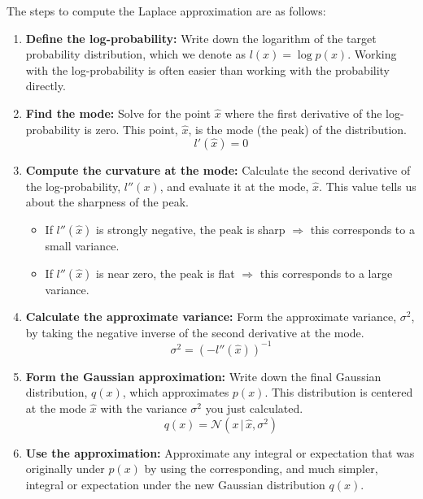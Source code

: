\documentclass{article}
\begin{document}
\begin{multicols}{2}
	The steps to compute the Laplace approximation are as follows:

	\begin{enumerate}
		\item \textbf{Define the log-probability:}
		      Write down the logarithm of the target probability distribution, which we denote as $l(x) = \log p(x)$. Working with the log-probability is often easier than working with the probability directly.

		\item \textbf{Find the mode:}
		      Solve for the point $\hat{x}$ where the first derivative of the log-probability is zero. This point, $\hat{x}$, is the mode (the peak) of the distribution.
		      $$ l'(\hat{x}) = 0 $$

		\item \textbf{Compute the curvature at the mode:}
		      Calculate the second derivative of the log-probability, $l''(x)$, and evaluate it at the mode, $\hat{x}$. This value tells us about the sharpness of the peak.
		      \begin{itemize}
			      \item If $l''(\hat{x})$ is strongly negative, the peak is sharp $\Rightarrow$ this corresponds to a small variance.
			      \item If $l''(\hat{x})$ is near zero, the peak is flat $\Rightarrow$ this corresponds to a large variance.
		      \end{itemize}

		\item \textbf{Calculate the approximate variance:}
		      Form the approximate variance, $\sigma^2$, by taking the negative inverse of the second derivative at the mode.
		      $$ \sigma^2 = (-l''(\hat{x}))^{-1} $$

		\item \textbf{Form the Gaussian approximation:}
		      Write down the final Gaussian distribution, $q(x)$, which approximates $p(x)$. This distribution is centered at the mode $\hat{x}$ with the variance $\sigma^2$ you just calculated.
		      $$ q(x) = \mathcal{N}(x \,|\, \hat{x}, \sigma^2) $$

		\item \textbf{Use the approximation:}
		      Approximate any integral or expectation that was originally under $p(x)$ by using the corresponding, and much simpler, integral or expectation under the new Gaussian distribution $q(x)$.

	\end{enumerate}


\end{multicols}
\end{document}
